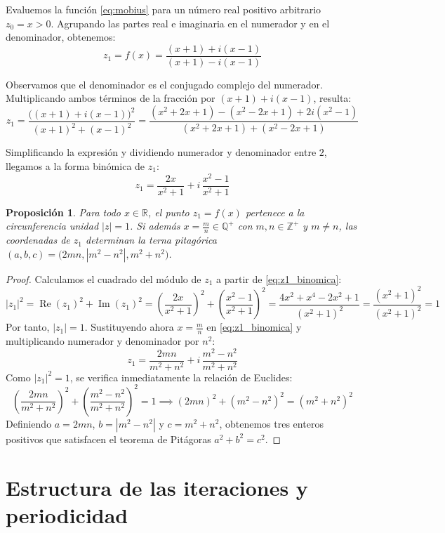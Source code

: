 \documentclass[11pt,a4paper]{article}
\theoremstyle{plain}
\newtheorem{proposicion}{Proposición}
\theoremstyle{definition}
\begin{document}
Evaluemos la función \eqref{eq:mobius} para un número real positivo arbitrario $z_0 = x > 0$. Agrupando las partes real e imaginaria en el numerador y en el denominador, obtenemos:
\[
z_1 = f(x) = \frac{(x + 1) + i(x - 1)}{(x + 1) - i(x - 1)}
\]

Observamos que el denominador es el conjugado complejo del numerador. Multiplicando ambos términos de la fracción por $(x + 1) + i(x - 1)$, resulta:
\[
z_1 = \frac{\bigl((x + 1) + i(x - 1)\bigr)^2}{(x + 1)^2 + (x - 1)^2} 
    = \frac{(x^2 + 2x + 1) - (x^2 - 2x + 1) + 2i(x^2 - 1)}{(x^2 + 2x + 1) + (x^2 - 2x + 1)}
\]

Simplificando la expresión y dividiendo numerador y denominador entre $2$, llegamos a la forma binómica de $z_1$:
\begin{equation}\label{eq:z1_binomica}
z_1 = \frac{2x}{x^2 + 1} + i\,\frac{x^2 - 1}{x^2 + 1}
\end{equation}

\begin{proposicion}
Para todo $x \in \mathbb{R}$, el punto $z_1 = f(x)$ pertenece a la circunferencia unidad $|z| = 1$. Si además $x = \frac{m}{n} \in \mathbb{Q}^+$ con $m, n \in \mathbb{Z}^+$ y $m \neq n$, las coordenadas de $z_1$ determinan la terna pitagórica $(a, b, c) = \bigl(2mn, |m^2 - n^2|, m^2 + n^2\bigr)$.
\end{proposicion}

\begin{proof}
Calculamos el cuadrado del módulo de $z_1$ a partir de \eqref{eq:z1_binomica}:
\[
|z_1|^2 = \operatorname{Re}(z_1)^2 + \operatorname{Im}(z_1)^2 
        = \left(\frac{2x}{x^2 + 1}\right)^2 + \left(\frac{x^2 - 1}{x^2 + 1}\right)^2 
        = \frac{4x^2 + x^4 - 2x^2 + 1}{(x^2 + 1)^2} 
        = \frac{(x^2 + 1)^2}{(x^2 + 1)^2} = 1
\]
Por tanto, $|z_1| = 1$. Sustituyendo ahora $x = \frac{m}{n}$ en \eqref{eq:z1_binomica} y multiplicando numerador y denominador por $n^2$:
\[
z_1 = \frac{2mn}{m^2 + n^2} + i\,\frac{m^2 - n^2}{m^2 + n^2}
\]
Como $|z_1|^2 = 1$, se verifica inmediatamente la relación de Euclides:
\[
\left(\frac{2mn}{m^2 + n^2}\right)^2 + \left(\frac{m^2 - n^2}{m^2 + n^2}\right)^2 = 1 
\implies (2mn)^2 + (m^2 - n^2)^2 = (m^2 + n^2)^2
\]
Definiendo $a = 2mn$, $b = |m^2 - n^2|$ y $c = m^2 + n^2$, obtenemos tres enteros positivos que satisfacen el teorema de Pitágoras $a^2 + b^2 = c^2$.
\end{proof}

\section{Estructura de las iteraciones y periodicidad}
\end{document}

